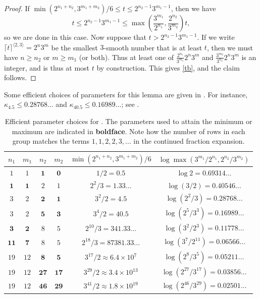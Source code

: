 \documentclass[12pt,a4paper,reqno]{amsart}
\numberwithin{equation}{section}
\theoremstyle{plain}
\theoremstyle{definition}
\begin{document}
\begin{proof}  If $\min( 2^{n_1+n_2},3^{m_1+m_2})/6 \leq t \leq 2^{n_2-1} 3^{m_1-1}$, then we have
\begin{equation}\label{tb} 
  t \leq 2^{n_2-1} 3^{m_1-1} \leq \max\left(\frac{3^{m_1}}{2^{n_1}}, \frac{2^{n_2}}{3^{m_2}}\right) t,
\end{equation}
so we are done in this case.  Now suppose that $t > 2^{n_2-1} 3^{m_1-1}$.
If we write $\lceil t \rceil^{\langle 2,3 \rangle} =2^n 3^m$ be the smallest $3$-smooth number that is at least $t$, then we must have $n \geq n_2$ or $m \geq m_1$ (or both).  Thus at least one of $\frac{2^{n_1}}{3^{m_1}} 2^n 3^m$ and $\frac{3^{m_2}}{3^{n_2}} 2^n 3^m$ is an integer, and is thus at most $t$ by construction.  This gives \eqref{tb}, and the claim follows.
\end{proof}

Some efficient choices of parameters for this lemma are given in .  For instance, $\kappa_{4.5} \leq 0.28768\dots$ and $\kappa_{40.5} \leq 0.16989\dots$; see .

\begin{table}[ht]
\centering
\begin{tabular}{|c|c|c|c|c|c|}
\hline
$n_1$ & $m_1$ & $n_2$ & $m_2$ & $\min(2^{n_1+n_2},3^{m_1+m_2})/6$ & $\log \max(3^{m_1}/2^{n_1}, 2^{n_2}/3^{m_2})$ \\
\hline
$1$ & $1$ & $\mathbf{1}$ & $\mathbf{0}$ & $1/2 = 0.5$ & $\log 2 = 0.69314\dots$ \\
\hline
$\mathbf{1}$ & $\mathbf{1}$ & $2$ & $1$ & $2^2/3 = 1.33\dots$ & $\log (3/2) = 0.40546\dots$\\
\hline
$3$ & $2$ & $\mathbf{2}$ & $\mathbf{1}$ & $3^2/2 = 4.5$ & $\log (2^2/3) = 0.28768\dots$ \\
$3$ & $2$ & $\mathbf{5}$ & $\mathbf{3}$ & $3^4/2 = 40.5$ & $\log (2^5/3^3) = 0.16989\dots$ \\
\hline
$\mathbf{3}$ & $\mathbf{2}$ & $8$ & $5$ & $2^{10}/3 = 341.33\dots$ & $\log (3^2/2^3) = 0.11778\dots$\\ 
$\mathbf{11}$ & $\mathbf{7}$ & $8$ & $5$ & $2^{18}/3 = 87381.33\dots$ & $\log (3^7/2^{11}) = 0.06566\dots$ \\
\hline
$19$ & $12$ & $\mathbf{8}$ & $\mathbf{5}$ & $3^{17}/2 \approx 6.4 \times 10^7$ & $\log (2^8/3^5) = 0.05211\dots$ \\
$19$ & $12$ & $\mathbf{27}$ & $\mathbf{17}$ & $3^{29}/2 \approx 3.4 \times 10^{13}$ & $\log (2^{27}/3^{17}) = 0.03856\dots$ \\
$19$ & $12$ & $\mathbf{46}$ & $\mathbf{29}$ & $3^{41}/2 \approx 1.8 \times 10^{19} $ & $\log (2^{46}/3^{29}) = 0.02501\dots$ \\
\hline
\end{tabular}
\caption{Efficient parameter choices for .  The parameters used to attain the minimum or maximum are indicated in \textbf{boldface}. Note how the number of rows in each group matches the terms $1,1,2,2,3,\dots$ in the continued fraction expansion.}\label{approx-table}
\end{table}
\end{document}
